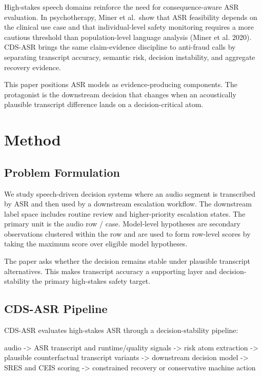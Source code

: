 \documentclass[
]{article}
\newenvironment{Shaded}{}{}
\newcommand{\NormalTok}[1]{#1}
\begin{document}
High-stakes speech domains reinforce the need for consequence-aware ASR
evaluation. In psychotherapy, Miner et al.~show that ASR feasibility
depends on the clinical use case and that individual-level safety
monitoring requires a more cautious threshold than population-level
language analysis (Miner et al. 2020). CDS-ASR brings the same
claim-evidence discipline to anti-fraud calls by separating transcript
accuracy, semantic risk, decision instability, and aggregate recovery
evidence.

This paper positions ASR models as evidence-producing components. The
protagonist is the downstream decision that changes when an acoustically
plausible transcript difference lands on a decision-critical atom.

\hypertarget{method}{%
\section{Method}\label{method}}

\hypertarget{problem-formulation}{%
\subsection{Problem Formulation}\label{problem-formulation}}

We study speech-driven decision systems where an audio segment is
transcribed by ASR and then used by a downstream escalation workflow.
The downstream label space includes routine review and higher-priority
escalation states. The primary unit is the audio row / case. Model-level
hypotheses are secondary observations clustered within the row and are
used to form row-level scores by taking the maximum score over eligible
model hypotheses.

The paper asks whether the decision remains stable under plausible
transcript alternatives. This makes transcript accuracy a supporting
layer and decision-stability the primary high-stakes safety target.

\hypertarget{cds-asr-pipeline}{%
\subsection{CDS-ASR Pipeline}\label{cds-asr-pipeline}}

CDS-ASR evaluates high-stakes ASR through a decision-stability pipeline:

\begin{Shaded}
\begin{Highlighting}[]
\NormalTok{audio}
\NormalTok{{-}\textgreater{} ASR transcript and runtime/quality signals}
\NormalTok{{-}\textgreater{} risk atom extraction}
\NormalTok{{-}\textgreater{} plausible counterfactual transcript variants}
\NormalTok{{-}\textgreater{} downstream decision model}
\NormalTok{{-}\textgreater{} SRES and CEIS scoring}
\NormalTok{{-}\textgreater{} constrained recovery or conservative machine action}
\end{Highlighting}
\end{Shaded}
\end{document}
